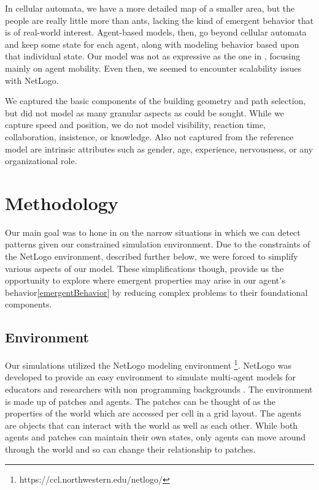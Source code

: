 \documentclass[12pt,letterpaper]{article}
\begin{document}
In cellular automata, we have a more detailed map of a smaller area, but the people are really little more than ants, lacking the kind of emergent behavior that is of real-world interest.  Agent-based models, then, go beyond cellular automata and keep some state for each agent, along with modeling behavior based upon that individual state.  Our model was not as expressive as the one in \cite{almeidaCrowdSimulationModeling2013}, focusing mainly on agent mobility. Even then, we seemed to encounter scalability issues with NetLogo. 

We captured the basic components of the building geometry and path selection, but did not model as many granular aspects as could be sought. While we capture speed and position, we do not model visibility, reaction time, collaboration, insistence, or knowledge. Also not captured from the reference model are intrinsic attributes such as gender, age, experience, nervousness, or any organizational role.

\section {Methodology}
Our main goal was to hone in on the narrow situations in which we can detect patterns given our constrained simulation environment.  Due to the constraints of the  NetLogo environment, described further below, we were forced to simplify various aspects of our model.  These simplifications though, provide us the opportunity to explore where emergent properties may arise in our agent's behavior\ref{emergentBehavior} by reducing complex problems to their foundational components.


\subsection{Environment} \label{Environment}

Our simulations utilized the NetLogo modeling environment \footnote{https://ccl.northwestern.edu/netlogo/}.  NetLogo was developed to provide an easy environment to simulate multi-agent models for educators and researchers with non programming backgrounds \cite{netlogo}.  The environment is made up of patches and agents.  The patches can be thought of as the properties of the world which are accessed per cell in a grid layout.  The agents are objects that can interact with the world as well as each other.  While both agents and patches can maintain their own states, only agents can move around through the world and so can change their relationship to patches.
\end{document}
